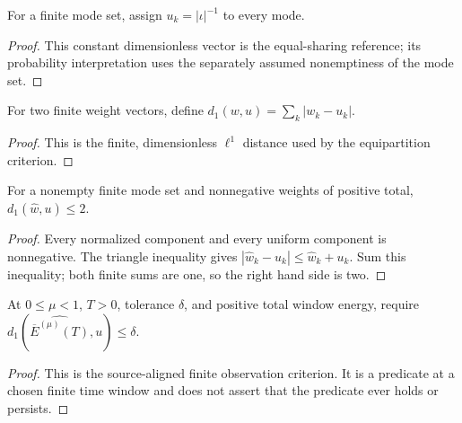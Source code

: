 \begin{definition}
\label{def:thermal:uniform-weights}
For a finite mode set, assign $u_k=|\iota|^{-1}$ to every mode.
\end{definition}
\begin{proof}

\leanok
This constant dimensionless vector is the equal-sharing reference; its
probability interpretation uses the separately assumed nonemptiness of the
mode set.
\end{proof}

\begin{definition}
\label{def:thermal:l1-distance}
For two finite weight vectors, define $d_1(w,u)=\sum_k|w_k-u_k|$.
\end{definition}
\begin{proof}

\leanok
This is the finite, dimensionless $\ell^1$ distance used by the
equipartition criterion.
\end{proof}

\begin{theorem}
\label{thm:thermal:l1-normalized-uniform-le-two}
For a nonempty finite mode set and nonnegative weights of positive total,
$d_1(\widehat w,u)\leq2$.
\end{theorem}
\begin{proof}

\leanok
Every normalized component and every uniform component is nonnegative.
The triangle inequality gives $|\widehat w_k-u_k|\leq\widehat w_k+u_k$.
Sum this inequality; both finite sums are one, so the right hand side is two.
\end{proof}

\begin{definition}
\label{def:thermal:approx-equipartition}
At $0\leq\mu<1$, $T>0$, tolerance $\delta$, and positive total window
energy, require $d_1(\widehat{\overline E^{(\mu)}(T)},u)\leq\delta$.
\end{definition}
\begin{proof}

\leanok
This is the source-aligned finite observation criterion.  It is a predicate
at a chosen finite time window and does not assert that the predicate ever
holds or persists.
\end{proof}

